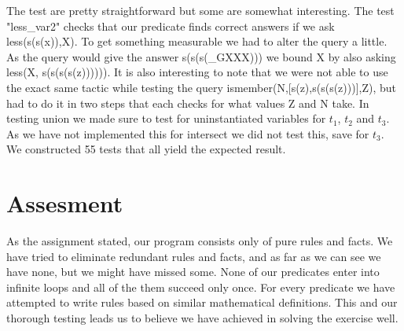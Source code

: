 \documentclass[]{article}
\begin{document}
The test are pretty straightforward but some are somewhat interesting. The test "less\_var2" checks that our predicate finds correct answers if we ask less(s(s(x)),X). To get something measurable we had to alter the query a little. As the query would give the answer s(s(s(\_GXXX))) we bound X by also asking less(X, s(s(s(s(z)))))). It is also interesting to note that we were not able to use the exact same tactic while testing the query ismember(N,[s(z),s(s(s(z)))],Z), but had to do it in two steps that each checks for what values Z and N take. In testing union we made sure to test for uninstantiated variables for $t_1$, $t_2$ and $t_3$. As we have not implemented this for intersect we did not test this, save for $t_3$.\\
We constructed 55 tests that all yield the expected result.

\section{Assesment} %
\label{sec:assesment}
As the assignment stated, our program consists only of pure rules and facts. We have tried to eliminate redundant rules and facts, and as far as we can see we have none, but we might have missed some.
None of our predicates enter into infinite loops and all of the them succeed only once.
For every predicate we have attempted to write rules based on similar mathematical definitions. This and our thorough testing leads us to believe we have achieved in solving the exercise well.\par



\end{document}
